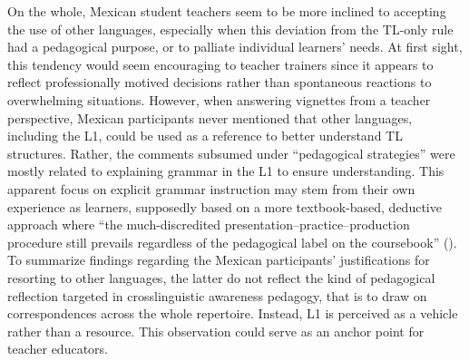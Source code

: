 \documentclass[output=paper]{../langscibook}
\begin{document}
On the whole, Mexican student teachers seem to be more inclined to accepting the use of other languages, especially when this deviation from the TL-only rule had a pedagogical purpose, or to palliate individual learners’ needs. At first sight, this tendency would seem encouraging to teacher trainers since it appears to reflect professionally motived decisions rather than spontaneous reactions to overwhelming situations. However, when answering vignettes from a teacher perspective, Mexican participants never mentioned that other languages, including the L1, could be used as a reference to better understand TL structures. Rather, the comments subsumed under “pedagogical strategies” were mostly related to explaining grammar in the L1 to ensure understanding. This apparent focus on explicit grammar instruction may stem from their own experience as learners, supposedly based on a more textbook-based, deductive approach where “the much-discredited presentation--practice--production procedure still prevails regardless of the pedagogical label on the coursebook” (\citealt{TomlinsonMasuhara2018}). To summarize findings regarding the Mexican participants’ justifications for resorting to other languages, the latter do not reflect the kind of pedagogical reflection targeted in crosslinguistic awareness pedagogy, that is to draw on correspondences across the whole repertoire. Instead, L1 is perceived as a vehicle rather than a resource. This observation could serve as an anchor point for teacher educators.
\end{document}

